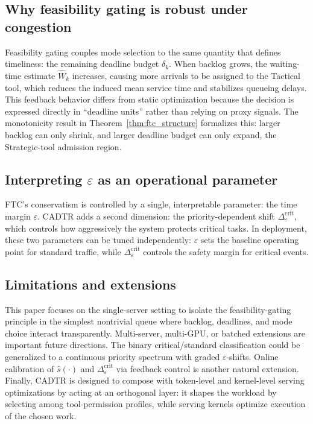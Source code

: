 \documentclass[preprint,12pt]{elsarticle}
\begin{document}
\subsection{Why feasibility gating is robust under congestion}
Feasibility gating couples mode selection to the same quantity that defines timeliness: the remaining deadline budget $\delta_k$. When backlog grows, the waiting-time estimate $\widehat{W}_k$ increases, causing more arrivals to be assigned to the Tactical tool, which reduces the induced mean service time and stabilizes queueing delays. This feedback behavior differs from static optimization because the decision is expressed directly in ``deadline units'' rather than relying on proxy signals. The monotonicity result in Theorem~\ref{thm:ftc_structure} formalizes this: larger backlog can only shrink, and larger deadline budget can only expand, the Strategic-tool admission region.

\subsection{Interpreting $\varepsilon$ as an operational parameter}
FTC's conservatism is controlled by a single, interpretable parameter: the time margin $\varepsilon$. CADTR adds a second dimension: the priority-dependent shift $\Delta_{\varepsilon}^{\mathrm{crit}}$, which controls how aggressively the system protects critical tasks. In deployment, these two parameters can be tuned independently: $\varepsilon$ sets the baseline operating point for standard traffic, while $\Delta_{\varepsilon}^{\mathrm{crit}}$ controls the safety margin for critical events.

\subsection{Limitations and extensions}
This paper focuses on the single-server setting to isolate the feasibility-gating principle in the simplest nontrivial queue where backlog, deadlines, and mode choice interact transparently. Multi-server, multi-GPU, or batched extensions are important future directions. The binary critical/standard classification could be generalized to a continuous priority spectrum with graded $\varepsilon$-shifts. Online calibration of $\hat{s}(\cdot)$ and $\Delta_{\varepsilon}^{\mathrm{crit}}$ via feedback control is another natural extension. Finally, CADTR is designed to compose with token-level and kernel-level serving optimizations by acting at an orthogonal layer: it shapes the workload by selecting among tool-permission profiles, while serving kernels optimize execution of the chosen work.
\end{document}
